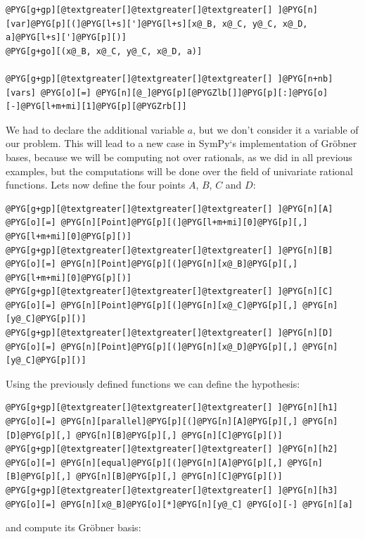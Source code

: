 \begin{Verbatim}[commandchars=@\[\]]
@PYG[g+gp][@textgreater[]@textgreater[]@textgreater[] ]@PYG[n][var]@PYG[p][(]@PYG[l+s][']@PYG[l+s][x@_B, x@_C, y@_C, x@_D, a]@PYG[l+s][']@PYG[p][)]
@PYG[g+go][(x@_B, x@_C, y@_C, x@_D, a)]

@PYG[g+gp][@textgreater[]@textgreater[]@textgreater[] ]@PYG[n+nb][vars] @PYG[o][=] @PYG[n][@_]@PYG[p][@PYGZlb[]]@PYG[p][:]@PYG[o][-]@PYG[l+m+mi][1]@PYG[p][@PYGZrb[]]
\end{Verbatim}
\noindent
We had to declare the additional variable $a$, but we don't consider it a variable of our problem. This
will lead to a new case in SymPy`s implementation of Gröbner bases, because we will be computing not
over rationals, as we did in all previous examples, but the computations will be done over the field of
univariate rational functions. Lets now define the four points $A$, $B$, $C$ and $D$:

\begin{Verbatim}[commandchars=@\[\]]
@PYG[g+gp][@textgreater[]@textgreater[]@textgreater[] ]@PYG[n][A] @PYG[o][=] @PYG[n][Point]@PYG[p][(]@PYG[l+m+mi][0]@PYG[p][,] @PYG[l+m+mi][0]@PYG[p][)]
@PYG[g+gp][@textgreater[]@textgreater[]@textgreater[] ]@PYG[n][B] @PYG[o][=] @PYG[n][Point]@PYG[p][(]@PYG[n][x@_B]@PYG[p][,] @PYG[l+m+mi][0]@PYG[p][)]
@PYG[g+gp][@textgreater[]@textgreater[]@textgreater[] ]@PYG[n][C] @PYG[o][=] @PYG[n][Point]@PYG[p][(]@PYG[n][x@_C]@PYG[p][,] @PYG[n][y@_C]@PYG[p][)]
@PYG[g+gp][@textgreater[]@textgreater[]@textgreater[] ]@PYG[n][D] @PYG[o][=] @PYG[n][Point]@PYG[p][(]@PYG[n][x@_D]@PYG[p][,] @PYG[n][y@_C]@PYG[p][)]
\end{Verbatim}
\noindent
Using the previously defined functions we can define the hypothesis:

\begin{Verbatim}[commandchars=@\[\]]
@PYG[g+gp][@textgreater[]@textgreater[]@textgreater[] ]@PYG[n][h1] @PYG[o][=] @PYG[n][parallel]@PYG[p][(]@PYG[n][A]@PYG[p][,] @PYG[n][D]@PYG[p][,] @PYG[n][B]@PYG[p][,] @PYG[n][C]@PYG[p][)]
@PYG[g+gp][@textgreater[]@textgreater[]@textgreater[] ]@PYG[n][h2] @PYG[o][=] @PYG[n][equal]@PYG[p][(]@PYG[n][A]@PYG[p][,] @PYG[n][B]@PYG[p][,] @PYG[n][B]@PYG[p][,] @PYG[n][C]@PYG[p][)]
@PYG[g+gp][@textgreater[]@textgreater[]@textgreater[] ]@PYG[n][h3] @PYG[o][=] @PYG[n][x@_B]@PYG[o][*]@PYG[n][y@_C] @PYG[o][-] @PYG[n][a]
\end{Verbatim}
\noindent
and compute its Gröbner basis:

